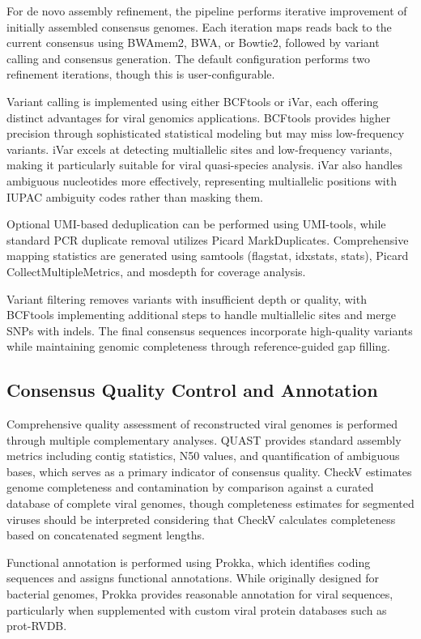 \documentclass[unnumsec,webpdf,contemporary,large]{oup-authoring-template}%
\theoremstyle{thmstyleone}%
\theoremstyle{thmstyletwo}%
\theoremstyle{thmstylethree}%
\begin{document}
For de novo assembly refinement, the pipeline performs iterative improvement of initially assembled consensus genomes. Each iteration maps reads back to the current consensus using BWAmem2, BWA, or Bowtie2, followed by variant calling and consensus generation. The default configuration performs two refinement iterations, though this is user-configurable.

Variant calling is implemented using either BCFtools or iVar, each offering distinct advantages for viral genomics applications. BCFtools provides higher precision through sophisticated statistical modeling but may miss low-frequency variants. iVar excels at detecting multiallelic sites and low-frequency variants, making it particularly suitable for viral quasi-species analysis. iVar also handles ambiguous nucleotides more effectively, representing multiallelic positions with IUPAC ambiguity codes rather than masking them.

Optional UMI-based deduplication can be performed using UMI-tools, while standard PCR duplicate removal utilizes Picard MarkDuplicates. Comprehensive mapping statistics are generated using samtools (flagstat, idxstats, stats), Picard CollectMultipleMetrics, and mosdepth for coverage analysis.

Variant filtering removes variants with insufficient depth or quality, with BCFtools implementing additional steps to handle multiallelic sites and merge SNPs with indels. The final consensus sequences incorporate high-quality variants while maintaining genomic completeness through reference-guided gap filling.

\subsection{Consensus Quality Control and Annotation}\label{subsec_qc}

Comprehensive quality assessment of reconstructed viral genomes is performed through multiple complementary analyses. QUAST provides standard assembly metrics including contig statistics, N50 values, and quantification of ambiguous bases, which serves as a primary indicator of consensus quality. CheckV \cite{Nayfach2021-wl} estimates genome completeness and contamination by comparison against a curated database of complete viral genomes, though completeness estimates for segmented viruses should be interpreted considering that CheckV calculates completeness based on concatenated segment lengths.

Functional annotation is performed using Prokka, which identifies coding sequences and assigns functional annotations. While originally designed for bacterial genomes, Prokka provides reasonable annotation for viral sequences, particularly when supplemented with custom viral protein databases such as prot-RVDB.
\end{document}
